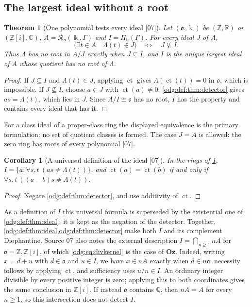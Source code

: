 \documentclass[11pt,oneside]{article}
\numberwithin{equation}{section}
\newtheorem{theorem}{Theorem}[section]
\newtheorem{corollary}[corollary]{Corollary}
\theoremstyle{definition}
\theoremstyle{remark}
\newcommand{\Oz}{\mathbf{Oz}}
\newcommand{\Z}{\mathbb Z}
\newcommand{\Q}{\mathbb Q}
\newcommand{\R}{\mathbb R}
\newcommand{\C}{\mathbb C}
\newcommand{\ct}{\operatorname{ct}}
\newcommand{\src}[1]{\textup{\textsf{\small[#1]}}}
\begin{document}
\subsection{The largest ideal without a root}

\begin{theorem}[One polynomial tests every ideal \src{07}]\label{odg:def:thm:idealtest}
Let $(\mathfrak o,\Bbbk)$ be $(\Z,\R)$ or $(\Z[i],\C)$,
$A=\mathcal R_{\mathfrak o}(\Bbbk,\Gamma)$ and $I=\Pi_\Bbbk(\Gamma)$. For every
ideal $J$ of $A$,
\begin{equation}\label{odg:def:eq:idealtest}
 \bigl(\exists t\in A\quad\Lambda(t)\in J\bigr)\quad\Longleftrightarrow\quad
 J\not\subseteq I .
\end{equation}
Thus $\Lambda$ has no root in $A/J$ exactly when $J\subseteq I$, and $I$ is the
unique largest ideal of $A$ whose quotient has no root of $\Lambda$.
\end{theorem}
\begin{proof}
If $J\subseteq I$ and $\Lambda(t)\in J$, applying $\ct$ gives
$\Lambda(\ct(t))=0$ in $\mathfrak o$, which is impossible. If $J\not\subseteq I$,
choose $a\in J$ with $\ct(a)\ne0$; \cref{odg:def:thm:detector} gives
$as=\Lambda(t)$, which lies in $J$. Since $A/I\cong\mathfrak o$ has no root,
$I$ has the property and contains every ideal that has it.
\end{proof}

For a class ideal of a proper-class ring the displayed equivalence is the
primary formulation; no set of quotient classes is formed. The case $J=A$ is
allowed: the zero ring has roots of every polynomial \src{07}.

\begin{corollary}[A universal definition of the ideal \src{07}]\label{odg:def:cor:universal}
In the rings of \cref{odg:def:thm:idealtest},
$I=\{a:\forall s,t\ (as\ne\Lambda(t))\}$, and $\ct(a)=\ct(b)$ if and only if
$\forall s,t\ ((a-b)s\ne\Lambda(t))$.
\end{corollary}
\begin{proof}
Negate \cref{odg:def:thm:detector}, and use additivity of $\ct$.
\end{proof}

As a definition of $I$ this universal formula is superseded by the
existential one of \cref{odg:def:thm:ideal}; it is kept as the negation of the
detector. Together, \cref{odg:def:thm:ideal,odg:def:thm:detector} make both $I$
and its complement Diophantine. Source 07 also notes the external description
$I=\bigcap_{n\ge1}nA$ for $\mathfrak o=\Z,\Z[i]$, of which
\eqref{odg:eq:divkernel} is the case of $\Oz$. Indeed, writing $x=d+u$ with
$d\in\mathfrak o$ and $u\in I$, we have $x\in nA$ exactly when
$d\in n\mathfrak o$: necessity follows by applying $\ct$, and sufficiency
uses $u/n\in I$. An ordinary integer divisible by every positive integer is
zero; applying this to both coordinates gives the same conclusion in
$\Z[i]$. If instead $\mathfrak o$ contains $\Q$, then $nA=A$ for every
$n\ge1$, so this intersection does not detect $I$.
\end{document}
